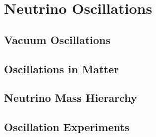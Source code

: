 \section{Neutrino Oscillations}
\label{sec:osc}


\subsection{Vacuum Oscillations}
\label{sec:VacOsc}


\subsection{Oscillations in Matter}
\label{sec:MSW}


\subsection{Neutrino Mass Hierarchy}
\label{sec:NMH}


\subsection{Oscillation Experiments}
\label{sec:OscExp}